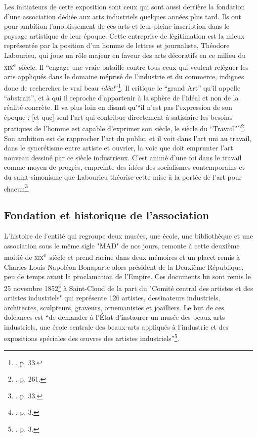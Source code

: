 Les initiateurs de cette exposition sont ceux qui sont aussi derrière la fondation d'une association dédiée aux arts industriels quelques années plus tard. Ils ont pour ambition l’anoblissement de ces arts et leur pleine inscription dans le paysage artistique de leur époque. Cette entreprise de légitimation est la mieux représentée par la position d'un homme de lettres et journaliste, Théodore Labourieu, qui joue un rôle majeur en faveur des arts décoratifs en ce milieu du \textsc{xix}\textsuperscript{e}~siècle. Il \enquote{engage une vraie bataille contre tous ceux qui veulent reléguer les arts appliqués dans le domaine méprisé de l'industrie et du commerce, indignes donc de rechercher le vrai beau \textit{idéal}}\footnote{\cite{froissart_union_1990}. p. 33.}. Il critique le \textquotedblleft grand Art\textquotedblright{} qu'il appelle \textquotedblleft abstrait\textquotedblright{}, et à qui il reproche d'appartenir à la sphère de l'idéal et non de la réalité concrète. Il va plus loin en disant qu'\enquote{il n'est pas l'expression de son époque ; [et que] seul l'art qui contribue directement à satisfaire les besoins pratiques de l'homme est capable d'exprimer son siècle, le siècle du \textquotedblleft Travail\textquotedblright{}}\footnote{\cite{labourieu_art_1857}. p. 261.}.
Son ambition est de rapprocher l'art du public, et il voit dans l'art uni au travail, dans le syncrétisme entre artiste et ouvrier, la voie que doit emprunter l'art nouveau dessiné par ce siècle industrieux. C'est animé d'une foi dans le travail comme moyen de progrès, empreinte des idées des socialismes contemporains et du saint-simonisme que Labourieu théorise cette mise à la portée de l'art pour chacun\footnote{\cite{froissart_union_1990}. p. 33.}. 

\subsection{Fondation et historique de l'association}

L'histoire de l'entité qui regroupe deux musées, une école, une bibliothèque et une association sous le même sigle "MAD" de nos jours, remonte à cette deuxième moitié de \textsc{xix}\textsuperscript{e}~siècle et prend racine dans deux mémoires et un placet remis à Charles Louis Napoléon Bonaparte alors président de la Deuxième République, peu de temps avant la proclamation de l'Empire. Ces documents lui sont remis le 25 novembre 1852\footnote{\cite{noauthor_origines_nodate}. p. 3.} à Saint-Cloud de la part du "Comité central des artistes et des artistes industriels" qui représente 126 artistes, dessinateurs industriels, architectes, sculpteurs, graveurs, ornemanistes et joailliers. Le but de ces doléances est \enquote{de demander à l'État d'instaurer un musée des beaux-arts industriels, une école centrale des beaux-arts appliqués à l'industrie et des expositions spéciales des œuvres des artistes industriels}\footnote{\cite{noauthor_origines_nodate}. p. 3.}. 

